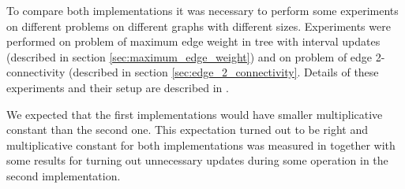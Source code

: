 To compare both implementations it was necessary to perform some experiments on
different problems on different graphs with different sizes. Experiments were
performed on problem of {\I maximum edge weight in tree with interval updates}
(described in section \ref{sec:maximum_edge_weight}) and on problem of {\I edge
2-connectivity} (described in section \ref{sec:edge_2_connectivity}. Details of
these experiments and their setup are described in .

We expected that the first implementations would have smaller multiplicative
constant than the second one. This expectation turned out to be right and
multiplicative constant for both implementations was measured in
 together with some results for turning out unnecessary
updates during some operation in the second implementation.
